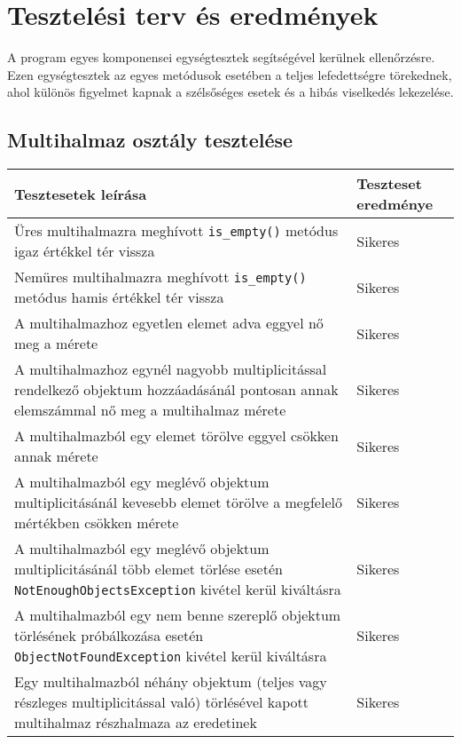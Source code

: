\newpage
\section{Tesztelési terv és eredmények}

A program egyes komponensei egységtesztek segítségével kerülnek ellenőrzésre. Ezen egységtesztek az egyes metódusok esetében a teljes lefedettségre törekednek, ahol különös figyelmet kapnak a szélsőséges esetek és a hibás viselkedés lekezelése.

\subsection{Multihalmaz osztály tesztelése}

\begin{table}[H]
	\centering
	\begin{tabular}{ | m{} | m{} | }
		\hline
		\textbf{Tesztesetek leírása} & \textbf{Teszteset eredménye} \\
		\hline \hline
		Üres multihalmazra meghívott \verb|is_empty()| metódus igaz értékkel tér vissza & Sikeres \\
		\hline
	Nemüres multihalmazra meghívott \verb|is_empty()| metódus hamis értékkel tér vissza & Sikeres \\
		\hline
		
		A multihalmazhoz egyetlen elemet adva eggyel nő meg a mérete &  Sikeres \\
		\hline
		
		A multihalmazhoz egynél nagyobb multiplicitással rendelkező objektum hozzáadásánál pontosan annak elemszámmal nő meg a multihalmaz mérete &  Sikeres \\
		\hline
		A multihalmazból egy elemet törölve eggyel csökken annak mérete &  Sikeres \\
		\hline
		
		A multihalmazból egy meglévő objektum multiplicitásánál kevesebb elemet törölve a megfelelő mértékben csökken mérete &  Sikeres \\
		\hline
		A multihalmazból egy meglévő objektum multiplicitásánál több elemet törlése esetén \verb|NotEnoughObjectsException| kivétel kerül kiváltásra &  Sikeres \\
		\hline
				A multihalmazból egy nem benne szereplő objektum törlésének próbálkozása esetén \verb|ObjectNotFoundException| kivétel kerül kiváltásra &  Sikeres \\
		\hline
		
		Egy multihalmazból néhány objektum (teljes vagy részleges multiplicitással való) törlésével  kapott multihalmaz részhalmaza az eredetinek &  Sikeres \\
		\hline
		

\end{tabular}
\end{table}
